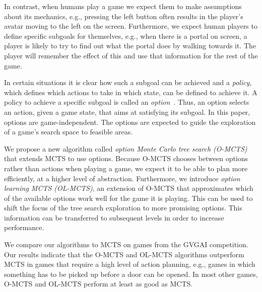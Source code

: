 In contrast, when humans play a game we expect them to make assumptions about
its mechanics, e.g., pressing the left button often results in the player's
avatar moving to the left on the screen.  Furthermore, we expect human players
to define specific subgoals for themselves, e.g., when there is a portal on
screen, a player is likely to try to find out what the portal does by walking
towards it.  The player will remember the effect of this and use that
information for the rest of the game.

In certain situations it is clear how such a subgoal can be achieved and a
\emph{policy}, which defines which actions to take in which state, can be
defined to achieve it. A policy to achieve a specific subgoal is called an
\emph{option}~\cite{sutton1999between}.  Thus, an option selects an action,
given a game state, that aims at satisfying its subgoal. In this paper, options
are game-independent. The options are expected to guide the exploration of a
game's search space to feasible areas.


We propose a new algorithm called \emph{option Monte Carlo tree search (O-MCTS)}
that extends MCTS to use options. Because O-MCTS chooses between options rather
than actions when playing a game, we expect it to be able to plan more
efficiently, at a higher level of abstraction. Furthermore, we introduce
\emph{option learning MCTS (OL-MCTS)}, an extension of O-MCTS that approximates
which of the available options work well for the game it is playing. This
can be used to shift the focus of the tree search exploration to more promising
options. This information can be transferred to subsequent levels in order to
increase performance.

We compare our algorithms to MCTS on games from the GVGAI competition. Our
results indicate that the O-MCTS and OL-MCTS algorithms outperform MCTS in games
that require a high level of action planning, e.g., games in which something has
to be picked up before a door can be opened. In most other games, O-MCTS and
OL-MCTS perform at least as good as MCTS\@.
